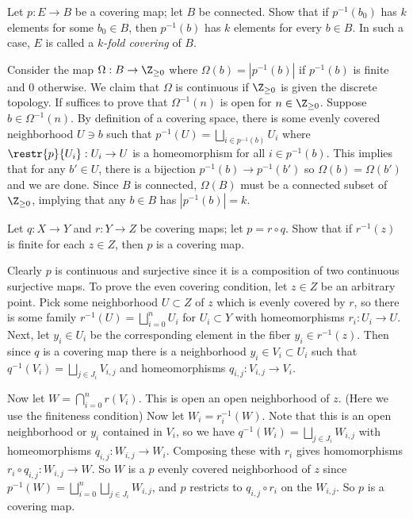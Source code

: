 \documentclass[11pt,letterpaper]{article}
\begin{document}
\begin{problem}
    Let $p : E \to B$ be a covering map; let $B$ be connected. Show that if $p^{-1}(b_0)$ has $k$ elements for some $b_0\in B$, then $p^{-1}(b)$ has $k$ elements for every $b\in B$. In such a case, $E$ is called a \emph{$k$-fold covering} of $B$.
\end{problem}

\begin{solution}
    Consider the map $\Omega : B \to \Z_{\geq 0}$ where $\Omega(b)=|p^{-1}(b)|$ if $p^{-1}(b)$ is finite and $0$ otherwise. We claim that $\Omega$ is continuous if $\Z_{\geq 0}$ is given the discrete topology. If suffices to prove that $\Omega^{-1}(n)$ is open for $n\in \Z_{\geq 0}$. Suppose $b\in \Omega^{-1}(n)$. By definition of a covering space, there is some evenly covered neighborhood $U\ni b$ such that $p^{-1}(U)=\bigsqcup_{i\in p^{-1}(b)}U_i$ where $\restr{p}{U_i} : U_i \to U$ is a homeomorphism for all $i\in p^{-1}(b)$. This implies that for any $b'\in U$, there is a bijection $p^{-1}(b) \to p^{-1}(b')$ so $\Omega(b)=\Omega(b')$ and we are done. Since $B$ is connected, $\Omega(B)$ must be a connected subset of $\Z_{\geq 0}$, implying that any $b\in B$ has $|p^{-1}(b)|=k$.
\end{solution}

\begin{problem}
    Let $q : X \to Y$ and $r : Y \to Z$ be covering maps; let $p=r\circ q$. Show that if $r^{-1}(z)$ is finite for each $z\in Z$, then $p$ is a covering map.
\end{problem}

\begin{solution}
    Clearly $p$ is continuous and surjective since it is a composition of two continuous surjective maps. To prove the even covering condition, let $z\in Z$ be an arbitrary point. Pick some neighborhood $U\subset Z$ of $z$ which is evenly covered by $r$, so there is some family $r^{-1}(U)=\bigsqcup_{i=0}^nU_i$ for $U_i\subset Y$ with homeomorphisms $r_i : U_i \to U$. Next, let $y_i\in U_i$ be the corresponding element in the fiber $y_i\in r^{-1}(z)$. Then since $q$ is a covering map there is a neighborhood $y_i\in V_i\subset U_i$ such that $q^{-1}(V_i)=\bigsqcup_{j\in J_i}V_{i,j}$ and homeomorphisms $q_{i,j} : V_{i,j} \to V_i$.
    
    Now let $W=\bigcap_{i=0}^nr(V_i)$. This is open an open neighborhood of $z$. (Here we use the finiteness condition) Now let $W_i=r_i^{-1}(W)$. Note that this is an open neighborhood or $y_i$ contained in $V_i$, so we have $q^{-1}(W_i)=\bigsqcup_{j\in J_i}W_{i,j}$ with homeomorphisms $q_{i,j} : W_{i,j} \to W_i$. Composing these with $r_i$ gives homomorphisms $r_i\circ q_{i,j} : W_{i,j} \to W$. So $W$ is a $p$ evenly covered neighborhood of $z$ since $p^{-1}(W) = \bigsqcup_{i=0}^n\bigsqcup_{j\in J_i}W_{i,j}$, and $p$ restricts to $q_{i,j}\circ r_i$ on the $W_{i,j}$. So $p$ is a covering map.
\end{solution}
\end{document}

